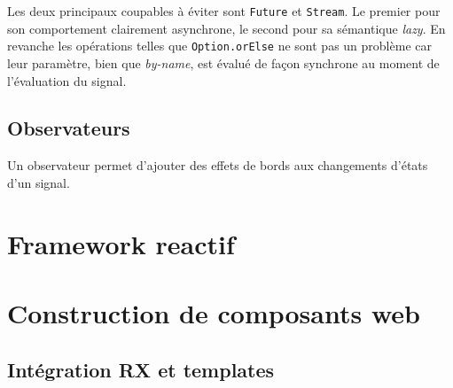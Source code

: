 Les deux principaux coupables à éviter sont \texttt{Future} et \texttt{Stream}. Le premier pour son comportement clairement asynchrone, le second pour sa sémantique \emph{lazy}. En revanche les opérations telles que \texttt{Option.orElse} ne sont pas un problème car leur paramètre, bien que \emph{by-name}, est évalué de façon synchrone au moment de l'évaluation du signal.

\subsection{Observateurs} \label{sec:sig-obs}

Un observateur permet d'ajouter des effets de bords aux changements d'états d'un signal.

\section{Framework reactif}

\section{Construction de composants web}
\subsection{Intégration RX et templates}